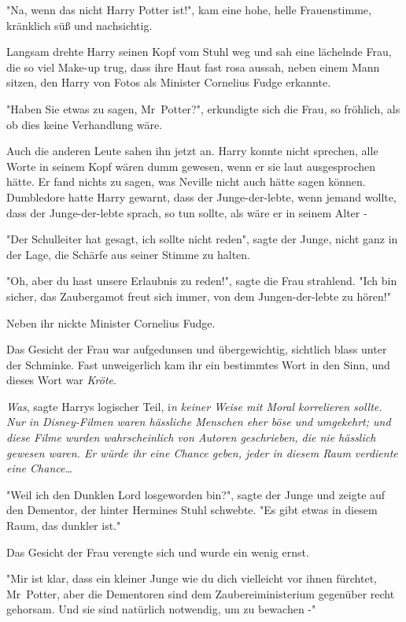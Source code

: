{"Na, wenn das nicht Harry Potter ist!", kam eine hohe, helle Frauenstimme, kränklich süß und nachsichtig.

Langsam drehte Harry seinen Kopf vom Stuhl weg und sah eine lächelnde Frau, die so viel Make-up trug, dass ihre Haut fast rosa aussah, neben einem Mann sitzen, den Harry von Fotos als Minister Cornelius Fudge erkannte.

"Haben Sie etwas zu sagen, Mr~Potter?", erkundigte sich die Frau, so fröhlich, als ob dies keine Verhandlung wäre.

Auch die anderen Leute sahen ihn jetzt an. Harry konnte nicht sprechen, alle Worte in seinem Kopf wären dumm gewesen, wenn er sie laut ausgesprochen hätte. Er fand nichts zu sagen, was Neville nicht auch hätte sagen können. Dumbledore hatte Harry gewarnt, dass der Junge-der-lebte, wenn jemand wollte, dass der Junge-der-lebte sprach, so tun sollte, als wäre er in seinem Alter -

"Der Schulleiter hat gesagt, ich sollte nicht reden", sagte der Junge, nicht ganz in der Lage, die Schärfe aus seiner Stimme zu halten.

"Oh, aber du hast unsere Erlaubnis zu reden!", sagte die Frau strahlend. "Ich bin sicher, das Zaubergamot freut sich immer, von dem Jungen-der-lebte zu hören!"

Neben ihr nickte Minister Cornelius Fudge.

Das Gesicht der Frau war aufgedunsen und übergewichtig, sichtlich blass unter der Schminke. Fast unweigerlich kam ihr ein bestimmtes Wort in den Sinn, und dieses Wort war \emph{Kröte}.

\emph{Was}, sagte Harrys logischer Teil, i\emph{n keiner Weise mit Moral korrelieren sollte. Nur in Disney-Filmen waren hässliche Menschen eher böse und umgekehrt; und diese Filme wurden wahrscheinlich von Autoren geschrieben, die nie hässlich gewesen waren. Er würde ihr eine Chance geben, jeder in diesem Raum verdiente eine Chance…}

"Weil ich den Dunklen Lord losgeworden bin?", sagte der Junge und zeigte auf den Dementor, der hinter Hermines Stuhl schwebte. "Es gibt etwas in diesem Raum, das dunkler ist."

Das Gesicht der Frau verengte sich und wurde ein wenig ernst.

"Mir ist klar, dass ein kleiner Junge wie du dich vielleicht vor ihnen fürchtet, Mr~Potter, aber die Dementoren sind dem Zaubereiministerium gegenüber recht gehorsam. Und sie sind natürlich notwendig, um zu bewachen -"

}
